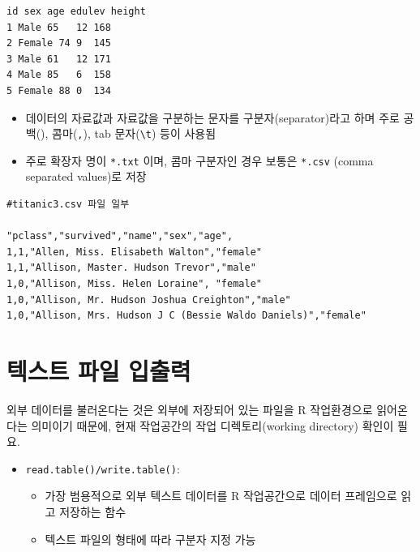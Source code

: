 \documentclass[
  11pt,
]{krantz}
\makeatletter
\providecommand{\tightlist}{%
  \setlength{\itemsep}{0pt}\setlength{\parskip}{0pt}}
\newenvironment{kframe}{%
\medskip{}
\setlength{\fboxsep}{.8em}
 \def\at@end@of@kframe{}%
 \ifinner\ifhmode%
  \def\at@end@of@kframe{\end{minipage}}%
  \begin{minipage}{\columnwidth}%
 \fi\fi%
 \def\FrameCommand##1{\hskip\@totalleftmargin \hskip-\fboxsep
 \colorbox{shadecolor}{##1}\hskip-\fboxsep
     \hskip-\linewidth \hskip-\@totalleftmargin \hskip\columnwidth}%
 \MakeFramed {\advance\hsize-\width
   \@totalleftmargin\z@ \linewidth\hsize
   \@setminipage}}%
 {\par\unskip\endMakeFramed%
 \at@end@of@kframe}
\newenvironment{rmdblock}[1]
  {
  \begin{itemize}
  \renewcommand{\labelitemi}{
    \raisebox{-.7\height}[0pt][0pt]{
      {\setkeys{Gin}{width=3em,keepaspectratio}\texttt{[image: images/\#1]}}
    }
  }
  \setlength{\fboxsep}{1em}
  \begin{kframe}
  \item
  }
  {
  \end{kframe}
  \end{itemize}
  }
\newenvironment{rmdcaution}
  {\begin{rmdblock}{caution}}
  {\end{rmdblock}}
\makeatother
\begin{document}
\begin{verbatim}
id sex age edulev height 
1 Male 65   12 168
2 Female 74 9  145
3 Male 61   12 171
4 Male 85   6  158
5 Female 88 0  134
\end{verbatim}

\begin{itemize}
\tightlist
\item
  데이터의 자료값과 자료값을 구분하는 문자를 구분자(separator)라고 하며 주로 공백(\texttt{}), 콤마(\texttt{,}), tab 문자(\texttt{\textbackslash{}t}) 등이 사용됨
\item
  주로 확장자 명이 \texttt{*.txt} 이며, 콤마 구분자인 경우 보통은 \texttt{*.csv} (comma separated values)로 저장
\end{itemize}

\begin{verbatim}
#titanic3.csv 파일 일부 

"pclass","survived","name","sex","age",
1,1,"Allen, Miss. Elisabeth Walton","female"
1,1,"Allison, Master. Hudson Trevor","male"
1,0,"Allison, Miss. Helen Loraine", "female"
1,0,"Allison, Mr. Hudson Joshua Creighton","male"
1,0,"Allison, Mrs. Hudson J C (Bessie Waldo Daniels)","female"
\end{verbatim}

\hypertarget{text-import-export}{%
\section{\texorpdfstring{\textbf{텍스트 파일 입출력}}{텍스트 파일 입출력}}\label{text-import-export}}

\footnotesize

\begin{rmdcaution}
외부 데이터를 불러온다는 것은 외부에 저장되어 있는 파일을 R 작업환경으로 읽어온다는 의미이기 때문에, 현재 작업공간의 작업 디렉토리(working directory) 확인이 필요.
\end{rmdcaution}

\normalsize

\begin{itemize}
\tightlist
\item
  \texttt{read.table()/write.table()}:

  \begin{itemize}
  \tightlist
  \item
    가장 범용적으로 외부 텍스트 데이터를 R 작업공간으로 데이터 프레임으로 읽고 저장하는 함수
  \item
    텍스트 파일의 형태에 따라 구분자 지정 가능
  \end{itemize}
\end{itemize}
\end{document}
